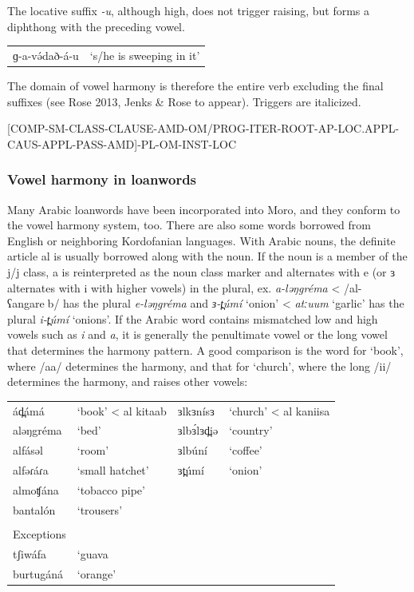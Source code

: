 The locative suffix \textit{-u}, although high, does not trigger raising, but forms a diphthong with the preceding vowel.

\ea
\begin{tabular}[t]{ll}
ɡ-a-və́dað-á-u	&	‘s/he is sweeping in it’\\
\end{tabular}
\z

The domain of vowel harmony is therefore the entire verb excluding the final suffixes (see Rose 2013, Jenks \& Rose to appear). Triggers are italicized. 

\textsc{[COMP-SM-CLASS-CLAUSE-AMD-OM/PROG-ITER-ROOT-AP-LOC.APPL-CAUS-APPL-PASS-AMD]-PL-OM-INST-LOC}

\subsubsection{Vowel harmony in loanwords}
Many Arabic loanwords have been incorporated into Moro, and they conform to the vowel harmony system, too. There are also some words borrowed from English or neighboring Kordofanian languages. With Arabic nouns, the definite article al is usually borrowed along with the noun. If the noun is a member of the j/j class, a is reinterpreted as the noun class marker and alternates with e (or ɜ alternates with i with higher vowels) in the plural, ex. \textit{a-ləŋgréma} < /al-ʕangareb/ has the plural \textit{e-ləŋgréma} and \textit{ɜ-t̪úmí} ‘onion’ < \textit{atːuum} ‘garlic’ has the plural \textit{i-t̪úmí} ‘onions’. If the Arabic word contains mismatched low and high vowels such as \textit{i} and \textit{a}, it is generally the penultimate vowel or the long vowel that determines the harmony pattern. A good comparison is the word for ‘book’, where /aa/ determines the harmony, and that for ‘church’, where the long /ii/ determines the harmony, and raises other vowels:

\ea
\begin{tabular}[t]{llll}
ád̪ámá		&	‘book’	< al kitaab	&	ɜlkɜnísɜ&	‘church’  < al kaniisa	\\
aləŋgréma	&	‘bed’			&	ɜlbɜ́lɜd̪iə	&	‘country’\\
alfásəl		&	‘room’ 			&	ɜlbúní		&	‘coffee’\\
alfəɾáɾa	&	‘small hatchet’	&	ɜt̪úmí		&	‘onion’\\
almoʧána	&	‘tobacco pipe’\\
bantalón	&	‘trousers’\\
&	\\
Exceptions\\
tʃiwáfa		&	‘guava\\
burtugáná	&	‘orange’\\
\end{tabular}
\z


